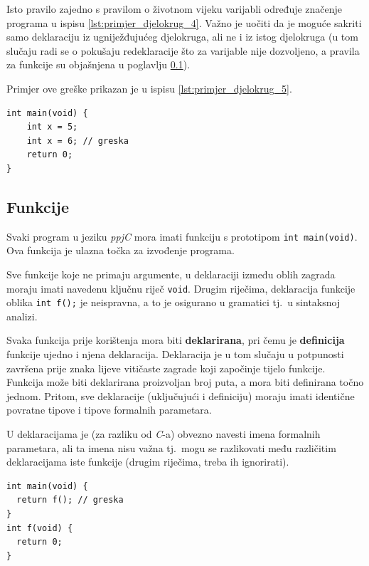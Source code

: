 \documentclass[times, 12pt, utf8]{book}
\begin{document}
Isto pravilo zajedno s pravilom o životnom vijeku varijabli određuje značenje programa u ispisu \ref{lst:primjer_djelokrug_4}.
Važno je uočiti da je moguće sakriti samo deklaraciju iz ugniježđujućeg djelokruga, ali ne i iz istog djelokruga (u tom slučaju radi se o pokušaju redeklaracije što za varijable nije dozvoljeno, a pravila za funkcije su objašnjena u poglavlju \ref{sec:semantika_funkcije}).

Primjer ove greške prikazan je u ispisu \ref{lst:primjer_djelokrug_5}.

\begin{lstlisting}[caption={Nedozvoljena redeklaracija varijable.},label=lst:primjer_djelokrug_5]
int main(void) {
    int x = 5;
    int x = 6; // greska
    return 0;
}
\end{lstlisting}

\subsection{Funkcije}\label{sec:semantika_funkcije}
Svaki program u jeziku \emph{ppjC} mora imati funkciju s prototipom \verb|int main(void)|.
Ova funkcija je ulazna točka za izvođenje programa.

Sve funkcije koje ne primaju argumente, u deklaraciji između oblih zagrada moraju imati navedenu ključnu riječ \verb|void|.
Drugim riječima, deklaracija funkcije oblika \verb|int f();| je neispravna, a to je osigurano u gramatici tj.~u sintaksnoj analizi.

Svaka funkcija prije korištenja mora biti \textbf{deklarirana}, pri čemu je \textbf{definicija} funkcije ujedno i njena deklaracija.
Deklaracija je u tom slučaju u potpunosti završena prije znaka lijeve vitičaste zagrade koji započinje tijelo funkcije.
Funkcija može biti deklarirana proizvoljan broj puta, a mora biti definirana točno jednom.
Pritom, sve deklaracije (uključujući i definiciju) moraju imati identične povratne tipove i tipove formalnih parametara.

U deklaracijama je (za razliku od \emph{C}-a) obvezno navesti imena formalnih parametara, ali ta imena nisu važna tj.~mogu se razlikovati među različitim deklaracijama iste funkcije (drugim riječima, treba ih ignorirati).

\begin{lstlisting}[caption={Funkcija \texttt{f} nije deklarirana prije korištenja.},label=lst:primjer_deklaracija_funkcija_1]
int main(void) {
  return f(); // greska
}
int f(void) {
  return 0;
}
\end{lstlisting}
\end{document}
